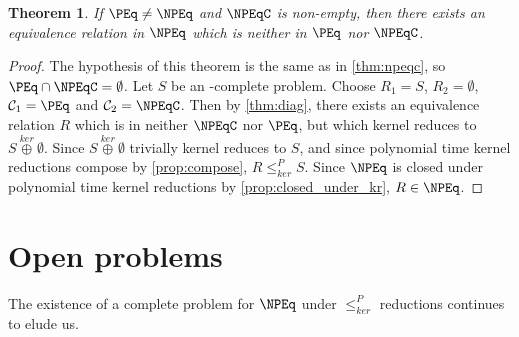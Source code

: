 \documentclass{article}
\newtheorem{theorem}{Theorem}[section]
\theoremstyle{definition} \newtheorem{definition}[definition]{Definition}
\newcommand{\kj}{\overset{ker}{\oplus}} %
\newcommand{\kr}{\leq^{P}_{ker}} %
\newcommand{\printintermediarytheorem}{If $\PEq\neq\NPEq$ and $\NPEqC$ is non-empty, then there exists an equivalence relation in $\NPEq$ which is neither in $\PEq$ nor $\NPEqC$.}
\begin{document}
\begin{theorem}\label{thm:intermediary}
  \printintermediarytheorem
\end{theorem}
\begin{proof}
  The hypothesis of this theorem is the same as in \autoref{thm:npeqc}, so $\PEq\cap\NPEqC=\emptyset$.
  Let $S$ be an \NPEq-complete problem.
  Choose $R_1=S$, $R_2=\emptyset$, $\mathcal{C}_1=\PEq$ and $\mathcal{C}_2=\NPEqC$.
  Then by \autoref{thm:diag}, there exists an equivalence relation $R$ which is in neither $\NPEqC$ nor $\PEq$, but which kernel reduces to $S\kj\emptyset$.
  Since $S\kj\emptyset$ trivially kernel reduces to $S$, and since polynomial time kernel reductions compose by \autoref{prop:compose}, $R\kr S$.
  Since $\NPEq$ is closed under polynomial time kernel reductions by \autoref{prop:closed_under_kr}, $R\in\NPEq$.
\end{proof}

\section{Open problems}
The existence of a complete problem for $\NPEq$ under $\kr$ reductions continues to elude us.

 
\end{document}
